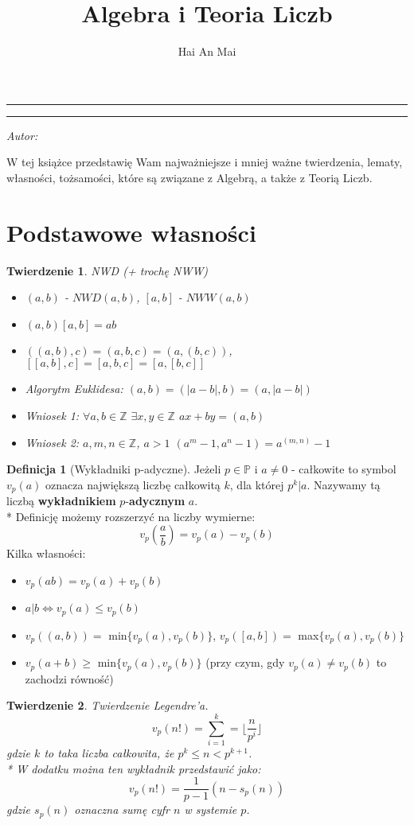 \documentclass[10pt,a4paper]{article}
\author{Hai An Mai}
\title{Algebra i Teoria Liczb}
\makeatletter
\newcommand{\linia}{\rule{\linewidth}{0.4mm}}
\renewcommand{\maketitle}{\begin{titlepage}
    \vspace*{4cm}
    \vspace{3cm}
    \noindent\linia
    \begin{center}
      \LARGE \textsc{\@title}
         \end{center}
     \linia
    \vspace{0.5cm}
    \begin{flushright}
    \begin{minipage}{5cm}
    \textit{\small Autor:}\\
    \normalsize \textsc{\@author} \par
    \end{minipage}
    \vspace{5cm}
     \end{flushright}
    \vspace*{\stretch{6}}
  \end{titlepage}%
}
\newcommand{\linia}{\rule{\linewidth}{0.4mm}}
\renewcommand{\maketitle}{\begin{titlepage}
		\vspace*{4cm}
		\vspace{3cm}
		\noindent\linia
		\begin{center}
			\LARGE \textsc{\@title}
		\end{center}
		\linia
		\vspace{0.5cm}
		\begin{flushright}
			\begin{minipage}{5cm}
				\textit{\small Autor:}\\
				\normalsize \textsc{\@author} \par
			\end{minipage}
			\vspace{5cm}
		\end{flushright}
		\vspace*{\stretch{6}}
	\end{titlepage}%
}
\theoremstyle{plain}
\newtheorem{thm}{Twierdzenie}[section]
\theoremstyle{definition}
\newtheorem{defi}{Definicja}[section]
\theoremstyle{remark}
\newcommand{\Z}{\mathbb{Z}}
\newcommand{\p}{\mathbb{P}}
\makeatother
\begin{document}
	\maketitle
	
	W tej książce przedstawię Wam najważniejsze i mniej ważne twierdzenia, lematy, własności, tożsamości, które są związane z Algebrą, a także z Teorią Liczb.
	\section{Podstawowe własności}
	\begin{thm}{NWD (+ trochę NWW)}
		\begin{itemize}
			\item 
			$(a,b)$ - $NWD(a,b)$, $[a,b]$ - $NWW(a,b)$
			\item 
			$(a,b)[a,b] = ab$
			\item 
			$((a,b),c) = (a,b,c) = (a,(b,c))$, $[[a,b],c]=[a,b,c]=[a,[b,c]]$
			\item 
			Algorytm Euklidesa: $(a,b)=(|a-b|,b)=(a,|a-b|)$
			\item 
			Wniosek 1: $\forall a,b \in \Z$ $\exists x,y \in \Z$ $ax+by = (a,b)$
			\item 
			Wniosek 2: $a,m,n \in \Z$, $ a>1$ $(a^m-1, a^n-1)=a^{(m,n)}-1$
		\end{itemize}
	\end{thm}
	
	\begin{defi}[Wykładniki p-adyczne]
		Jeżeli $p \in \p$ i $a \neq 0$ - całkowite to symbol $v_{p}(a)$ oznacza największą liczbę całkowitą $k$, dla której $p^k|a$. Nazywamy tą liczbą \textbf{wykładnikiem} $p$-\textbf{adycznym} $a$.
		\\* Definicję możemy rozszerzyć na liczby wymierne:
		$$v_p(\frac{a}{b})=v_p(a)-v_p(b)$$
		Kilka własności:
		\begin{itemize}
			\item 
			$v_p(ab) = v_p(a)+v_p(b)$
			\item 
			$a|b \Leftrightarrow v_p(a) \leq v_p(b)$
			\item 
			$v_p((a,b)) =$ min$\{v_p(a), v_p(b)\}$, $v_p([a,b]) =$ max$\{v_p(a), v_p(b)\}$ 
			\item 
			$v_p(a+b) \geq$ min$\{v_p(a), v_p(b)\}$ (przy czym, gdy $v_p(a) \neq v_p(b)$ to zachodzi równość)
		\end{itemize}
	\end{defi}
	\begin{thm}{Twierdzenie Legendre'a.}
		$${v_p(n!) = \sum_{i=1}^{k} = \lfloor \frac{n}{p^i} \rfloor}$$ 
		gdzie $k$ to taka liczba całkowita, że $p^k \leq n < p^{k+1}$.
		\\* W dodatku można ten wykładnik przedstawić jako: 
		$${v_p(n!) = \frac{1}{p-1}(n-s_p(n))}$$ gdzie $s_p(n)$ oznaczna sumę cyfr $n$ w systemie $p$.
	\end{thm}
	
\end{document}
